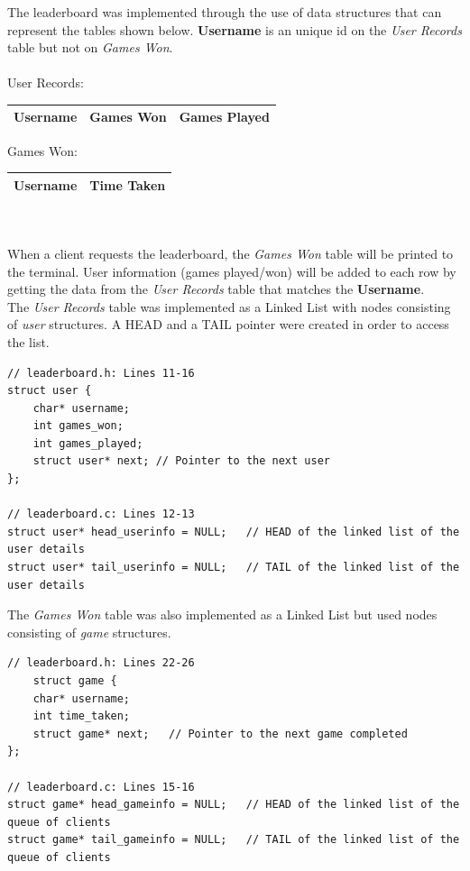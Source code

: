 The leaderboard was implemented through the use of data structures that can represent the tables shown below. \textbf{Username} is an unique id on the \textit{User Records} table but not on \textit{Games Won}.
\\
\\
User Records: 
\begin{tabular}{|c|c|c|}
	\hline
	\textbf{Username}&Games Won&Games Played\\
	\hline
\end{tabular}
\quad
Games Won: 
\begin{tabular}{|c|c|}
	\hline
	\textbf{Username}&Time Taken\\
	\hline
\end{tabular}
\\
\\
When a client requests the leaderboard, the \textit{Games Won} table will be printed to the terminal. User information (games played/won) will be added to each row by getting the data from the \textit{User Records} table that matches the \textbf{Username}. 
\\
The \textit{User Records} table was implemented as a Linked List with nodes consisting of \textit{user} structures. A HEAD and a TAIL pointer were created in order to access the list. 
\begin{lstlisting}[style=CStyle]
// leaderboard.h: Lines 11-16
struct user {
	char* username;         
	int games_won;
	int games_played;     
	struct user* next; // Pointer to the next user
};

// leaderboard.c: Lines 12-13
struct user* head_userinfo = NULL;   // HEAD of the linked list of the user details
struct user* tail_userinfo = NULL;   // TAIL of the linked list of the user details
\end{lstlisting}
The \textit{Games Won} table was also implemented as a Linked List but used nodes consisting of \textit{game} structures.
\begin{lstlisting}[style=CStyle]
// leaderboard.h: Lines 22-26
	struct game {
	char* username; 
	int time_taken;       
	struct game* next;   // Pointer to the next game completed
};

// leaderboard.c: Lines 15-16
struct game* head_gameinfo = NULL;   // HEAD of the linked list of the queue of clients
struct game* tail_gameinfo = NULL;   // TAIL of the linked list of the queue of clients
\end{lstlisting}
